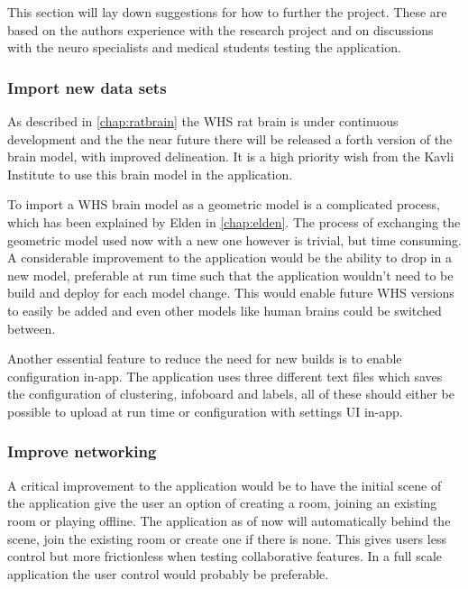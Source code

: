 





This section will lay down suggestions for how to further the project. These are based on the authors experience with the research project and on discussions with the neuro specialists and medical students testing the application.

\subsubsection*{Import new data sets}

As described in \autoref{chap:ratbrain} the WHS rat brain is under continuous development and the the near future there will be released a forth version of the brain model, with improved delineation. It is a high priority wish from the Kavli Institute to use this brain model in the application.

To import a WHS brain model as a geometric model is a complicated process, which has been explained by Elden in \autoref{chap:elden}.
The process of exchanging the geometric model used now with a new one however is trivial, but time consuming. A considerable improvement to the application would be the ability to drop in a new model, preferable at run time such that the application wouldn't need to be build and deploy for each model change.
This would enable future WHS versions to easily be added and even other models like human brains could be switched between.  

Another essential feature to reduce the need for new builds is to enable configuration in-app. The application uses three different text files which saves the configuration of clustering, infoboard and labels, all of these should either be possible to upload at run time or configuration with settings UI in-app.

\subsubsection*{Improve networking}
A critical improvement to the application would be to have the initial scene of the application give the user an option of creating a room, joining an existing room or playing offline.
The application as of now will automatically behind the scene, join the existing room or create one if there is none. This gives users less control but more frictionless when testing collaborative features. In a full scale application the user control would probably be preferable.

